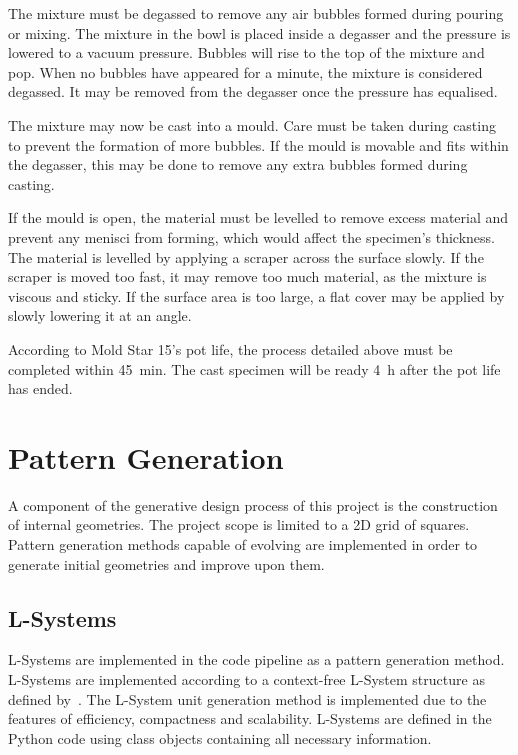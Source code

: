 The mixture must be degassed to remove any air bubbles formed during pouring or mixing. The mixture in the bowl is placed inside a degasser and the pressure is lowered to a vacuum pressure. Bubbles will rise to the top of the mixture and pop. When no bubbles have appeared for a minute, the mixture is considered degassed. It may be removed from the degasser once the pressure has equalised.

The mixture may now be cast into a mould. Care must be taken during casting to prevent the formation of more bubbles. If the mould is movable and fits within the degasser, this may be done to remove any extra bubbles formed during casting.

If the mould is open, the material must be levelled to remove excess material and prevent any menisci from forming, which would affect the specimen's thickness. The material is levelled by applying a scraper across the surface slowly. If the scraper is moved too fast, it may remove too much material, as the mixture is viscous and sticky. If the surface area is too large, a flat cover may be applied by slowly lowering it at an angle.

According to Mold Star 15's pot life, the process detailed above must be completed within \SI{45}{\minute}. The cast specimen will be ready \SI{4}{\hour} after the pot life has ended.

\section{Pattern Generation}

A component of the generative design process of this project is the construction of internal geometries. The project scope is limited to a 2D grid of squares. Pattern generation methods capable of evolving are implemented in order to generate initial geometries and improve upon them.

\subsection{L-Systems}
\label{ssec:LS}

L-Systems are implemented in the code pipeline as a pattern generation method. L-Systems are implemented according to a context-free L-System structure as defined by~\cite{Prusinkiewicz2004}. The L-System unit generation method is implemented due to the features of efficiency, compactness and scalability. L-Systems are defined in the Python code using class objects containing all necessary information.

